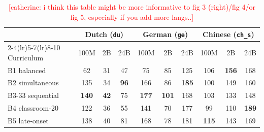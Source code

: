 \begin{table}[!ht]
  \centering \small
  \setlength{\tabcolsep}{5pt}
  \label{tab:meco_curriculum_matched}
  \begin{tabular}{l ccc ccc ccc}
    \toprule
    & \multicolumn{3}{c}{\textbf{Dutch} (\texttt{du})} & \multicolumn{3}{c}{\textbf{German} (\texttt{ge})} & \multicolumn{3}{c}{\textbf{Chinese} (\texttt{ch\_s})} \\
    \cmidrule(lr){2-4}\cmidrule(lr){5-7}\cmidrule(lr){8-10}
    Curriculum & 100M & 2B & 24B & 100M & 2B & 24B & 100M & 2B & 24B \\
    \midrule
    B1 balanced       & 62  & 31 & 47          & 75  & 85          & 125          & 106          & \textbf{156} & 168 \\
    B2 simultaneous   & 135 & 34 & \textbf{96} & 166 & 86 & \textbf{185} & 100          & 149          & 160 \\
    B3-33 sequential  & \textbf{140} & \textbf{42} & 75 & \textbf{177} & \textbf{101} & 168 & 103          & 133          & 148 \\
    B4 classroom-20   & 122 & 36 & 55          & 141 & 70          & 177          & 99           & 110          & \textbf{189} \\
    B5 late-onset     & 138 & 40 & 81          & 168 & 78          & 181          & \textbf{115} & 143          & 169 \\
    \bottomrule
  \end{tabular}
  \caption{\textcolor{red}{[catherine: i think this table might be more informative to fig 3 (right)/fig 4/or fig 5, especially if you add more langs..]}}
\end{table}
